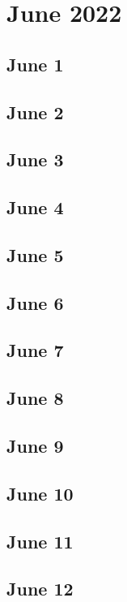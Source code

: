 \chapter{June 2022}

\section{June 1}

\section{June 2}

\section{June 3}

\section{June 4}

\section{June 5}

\section{June 6}

\section{June 7}

\section{June 8}

\section{June 9}

\section{June 10}

\section{June 11}

\section{June 12}

